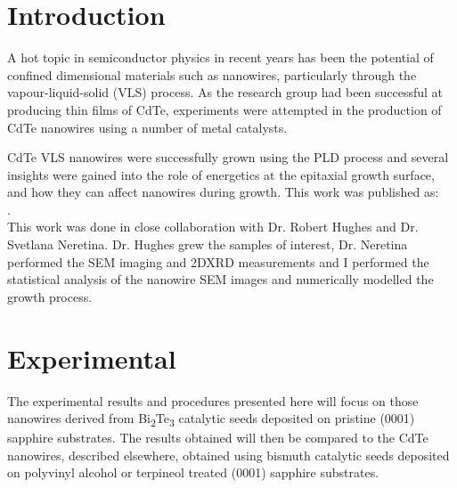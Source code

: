 \section{Introduction} \label{sec:cdtenanowires}
A hot topic in semiconductor physics in recent years has been the potential of confined dimensional materials such as nanowires, particularly through the vapour-liquid-solid (VLS) process.
As the research group had been successful at producing thin films of CdTe, experiments were attempted in the production of CdTe nanowires using a number of metal catalysts.

CdTe VLS nanowires were successfully grown using the PLD process and several insights were gained into the role of energetics at the epitaxial growth surface, and how they can affect nanowires during growth.
This work was published as:\\
 \cite{Neretina2008b}.\\
This work was done in close collaboration with Dr. Robert Hughes and Dr. Svetlana Neretina. Dr. Hughes grew the samples of interest, Dr. Neretina performed the SEM imaging and 2DXRD measurements and I performed the statistical analysis of the nanowire SEM images and numerically modelled the growth process.
\section{Experimental}
The experimental results and procedures presented here will focus on those nanowires derived from Bi\textsubscript{2}Te\textsubscript{3} catalytic seeds deposited on pristine (0001) sapphire substrates.
The results obtained will then be compared to the CdTe nanowires, described elsewhere\cite{Neretina2007b}, obtained using bismuth catalytic seeds deposited on polyvinyl alcohol or terpineol treated (0001) sapphire substrates.


